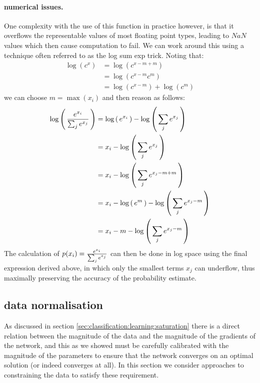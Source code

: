 \documentclass[msc]{infthesis}
\newcommand{\of}[1]{\left(\,{#1}\,\right)}
\begin{document}
\paragraph*{numerical issues.}
\label{sec:classification:3-2-2}
One complexity with the use of this function in practice however, is that it overflows
the representable values of most floating point types, leading to \(NaN\) values which
then cause computation to fail.  We can work around this using a technique often referred
to as the log sum exp trick.  Noting that:
%
\begin{align}
\log( c^{x} ) 
&= \log( c^{x - m + m } ) \\
&= \log( c^{x - m } c^{m} ) \\
&= \log( c^{x - m } ) + \log( c^{m} ) 
\end{align}
%
we can choose \(m = \max( x_i )\) and then reason as follows:
\begin{align}
  \label{eq:softmax-log-sum-exp}
  \log\of{ e^{x_i} \over \sum_{j} e^{x_j} }
  &=
  \log\of{e^{x_i}} - \log\of{\sum_{j} e^{x_j} }
  \\
  &=
  x_i - \log\of{\sum_{j} e^{x_j} }
  \\
  &=
  x_i - \log\of{\sum_{j} e^{x_j - m + m} }
  \\
  &=
  x_i - \log\of{e^m} - \log\of{\sum_{j} e^{x_j - m} }
  \\
  &=
  x_i - m - \log\of{\sum_{j} e^{x_j - m} }
\end{align}
%
The calculation of \(p(x_i) = {e^{x_i} \over \sum_j e^{x_j}}\) can then be done in log space using
the final expression derived above, in which only the smallest terms \(x_j\) can underflow, thus
maximally preserving the accuracy of the probability estimate.



\subsection{data normalisation}
\label{sec:classification:3-4}

As discussed in section \ref{sec:classification:learning:saturation} there is a direct relation
between the magnitude of the data and the magnitude of the gradients of the network, and this
as we showed must be carefully calibrated with the magnitude of the parameters to ensure that 
the network converges on an optimal solution (or indeed converges at all).  In this section we
consider approaches to constraining the data to satisfy these requirement. 
\end{document}
